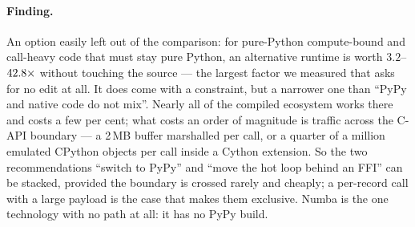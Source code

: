 \paragraph{Finding.} An option easily left out of the comparison: for pure-Python
compute-bound and call-heavy code that must stay pure Python, an alternative runtime is worth
$3.2$--$\meas{ratio:b1_compute-314:matmul/cpython_loop|b1_compute-pypy311:matmul/cpython_loop}{42.8}\times$ without touching the source --- the largest factor we measured that asks for
no edit at all. It does come with a constraint, but a narrower one than ``PyPy and native
code do not mix''. Nearly all of the compiled ecosystem works there and costs a few per cent;
what costs an order of magnitude is traffic across the C-API boundary --- a 2\,MB buffer
marshalled per  call, or a quarter of a million emulated CPython objects per call inside a
Cython extension. So the two recommendations ``switch to PyPy'' and ``move the hot loop behind
an FFI'' can be stacked, provided the boundary is crossed rarely and cheaply; a per-record call
with a large payload is the case that makes them exclusive. Numba is the one technology with no
path at all: it has no PyPy build.
